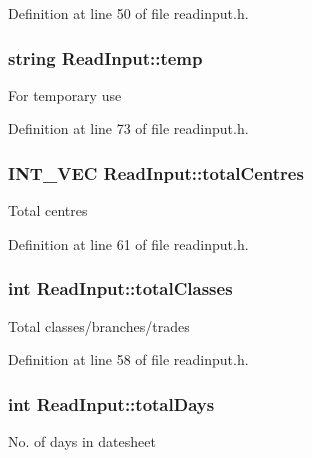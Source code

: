 \-Definition at line 50 of file readinput.\-h.

\hypertarget{classReadInput_ab10b4c63b69664f292d1c66028618008}{
\subsubsection[{temp}]{\setlength{\rightskip}{0pt plus 5cm}string {\bf \-Read\-Input\-::temp}}}\label{de/d50/classReadInput_ab10b4c63b69664f292d1c66028618008}
\-For temporary use 

\-Definition at line 73 of file readinput.\-h.

\hypertarget{classReadInput_ae6732644e5c3efd46f562493351c9820}{
\subsubsection[{total\-Centres}]{\setlength{\rightskip}{0pt plus 5cm}\-I\-N\-T\-\_\-\-V\-E\-C {\bf \-Read\-Input\-::total\-Centres}}}\label{de/d50/classReadInput_ae6732644e5c3efd46f562493351c9820}
\-Total centres 

\-Definition at line 61 of file readinput.\-h.

\hypertarget{classReadInput_a32d11288922cc26708b20324ae7b7a77}{
\subsubsection[{total\-Classes}]{\setlength{\rightskip}{0pt plus 5cm}int {\bf \-Read\-Input\-::total\-Classes}}}\label{de/d50/classReadInput_a32d11288922cc26708b20324ae7b7a77}
\-Total classes/branches/trades 

\-Definition at line 58 of file readinput.\-h.

\hypertarget{classReadInput_a40dc15f03ab1d4c998aa48f2a7176574}{
\subsubsection[{total\-Days}]{\setlength{\rightskip}{0pt plus 5cm}int {\bf \-Read\-Input\-::total\-Days}}}\label{de/d50/classReadInput_a40dc15f03ab1d4c998aa48f2a7176574}
\-No. of days in datesheet 

